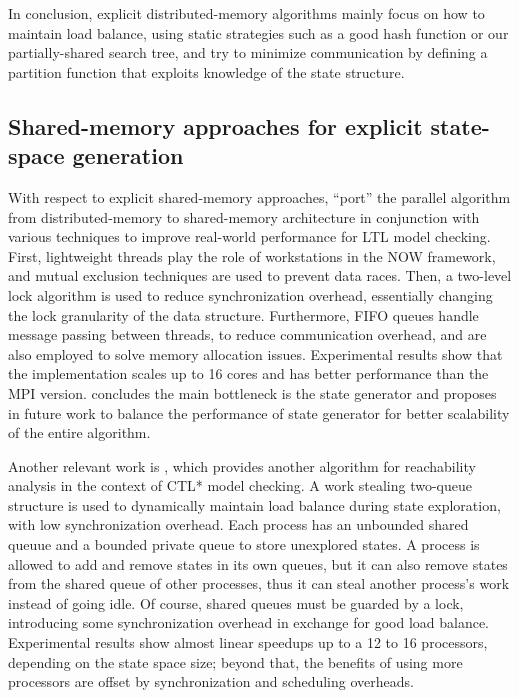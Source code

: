 \documentclass[copyright,creativecommons]{eptcs}
\begin{document}
In conclusion, explicit distributed-memory algorithms mainly focus on
how to maintain load balance, using static strategies such as a good
hash function or our partially-shared search tree,
and try to minimize communication by defining a partition function that
exploits knowledge of the state structure.

\subsection{Shared-memory approaches for explicit state-space generation}
\label{sec:Exp_Shared}

With respect to explicit shared-memory approaches,
\cite{BarnatBR07, Barnat2008Divine} ``port'' the parallel algorithm
from distributed-memory to shared-memory architecture in conjunction with
various techniques to improve real-world performance for LTL model checking.
First, lightweight threads play the role of workstations in the
NOW framework, and mutual exclusion techniques are used to prevent data races. 
Then, a two-level lock algorithm is used to reduce synchronization
overhead, essentially changing the lock granularity of the data structure.
Furthermore, FIFO queues handle message passing between threads, to reduce
communication overhead, and are also employed to solve memory allocation issues.
Experimental results show that the implementation scales up to 16 cores and 
has better performance than the MPI version.
\cite{BarnatBR07} concludes the main bottleneck is the state generator
and proposes in future work to balance the performance of state generator
for better scalability of the entire algorithm. 

Another relevant work is \cite{Inggs2002},
which provides another algorithm for reachability analysis
in the context of CTL* model checking.
A work stealing two-queue structure is used to dynamically maintain
load balance during state exploration, with low synchronization overhead.
Each process has an unbounded shared queuue and a bounded private queue
to store unexplored states.
A process is allowed to add and remove states in its own queues, but it can
also remove states from the shared queue of other processes, thus it
can steal another process's work instead of going idle.
Of course, shared queues must be guarded by a lock, introducing
some synchronization overhead in exchange for good load balance. 
Experimental results show almost linear speedups up to a 
12 to 16 processors, depending on the state space size;
beyond that, the benefits of using more processors are offset by
synchronization and scheduling overheads. 
\end{document}
